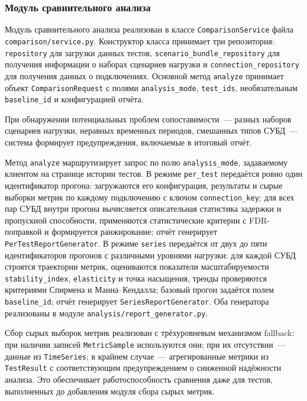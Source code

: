 \subsubsection{Модуль сравнительного анализа}

Модуль сравнительного анализа реализован в классе \texttt{ComparisonService} файла \texttt{comparison/service.py}. Конструктор класса принимает три репозитория: \texttt{repository} для загрузки данных тестов, \texttt{scenario\_bundle\_repository} для получения информации о наборах сценариев нагрузки и \texttt{connection\_repository} для получения данных о подключениях. Основной метод \texttt{analyze} принимает объект \texttt{ComparisonRequest} с полями \texttt{analysis\_mode}, \texttt{test\_ids}, необязательным \texttt{baseline\_id} и конфигурацией отчёта.

При обнаружении потенциальных проблем сопоставимости~--- разных наборов сценариев нагрузки, неравных временных периодов, смешанных типов СУБД~--- система формирует предупреждения, включаемые в итоговый отчёт.

Метод \texttt{analyze} маршрутизирует запрос по полю \texttt{analysis\_mode}, задаваемому клиентом на странице истории тестов. В режиме \texttt{per\_test} передаётся ровно один идентификатор прогона: загружаются его конфигурация, результаты и сырые выборки метрик по каждому подключению с ключом \texttt{connection\_key}; для всех пар СУБД внутри прогона вычисляется описательная статистика задержки и пропускной способности, применяются статистические критерии с FDR-поправкой и формируется ранжирование; отчёт генерирует \texttt{PerTestReportGenerator}. В режиме \texttt{series} передаётся от двух до пяти идентификаторов прогонов с различными уровнями нагрузки: для каждой СУБД строятся траектории метрик, оцениваются показатели масштабируемости \texttt{stability\_index}, \texttt{elasticity} и точка насыщения, тренды проверяются критериями Спирмена и Манна--Кендалла; базовый прогон задаётся полем \texttt{baseline\_id}; отчёт генерирует \texttt{SeriesReportGenerator}. Оба генератора реализованы в модуле \texttt{analysis/report\_generator.py}.

Сбор сырых выборок метрик реализован с трёхуровневым механизмом fallback: при наличии записей \texttt{MetricSample} используются они; при их отсутствии~--- данные из \texttt{TimeSeries}; в крайнем случае~--- агрегированные метрики из \texttt{TestResult} с соответствующим предупреждением о сниженной надёжности анализа. Это обеспечивает работоспособность сравнения даже для тестов, выполненных до добавления модуля сбора сырых метрик.

